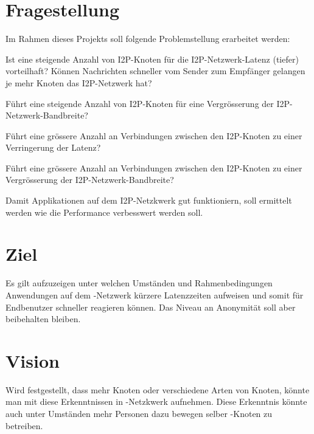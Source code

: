 \section{Fragestellung}

Im Rahmen dieses Projekts soll folgende Problemstellung erarbeitet werden:

\begin{hyp} \label{hyp:first}
    Ist eine steigende Anzahl von I2P-Knoten für die I2P-Netzwerk-Latenz (tiefer) vorteilhaft?
    Können Nachrichten schneller vom Sender zum Empfänger gelangen je mehr Knoten das I2P-Netzwerk hat?
\end{hyp}

\begin{hyp} \label{hyp:second}
    Führt eine steigende Anzahl von I2P-Knoten für eine Vergrösserung der I2P-Netzwerk-Bandbreite?
\end{hyp}

\begin{hyp} \label{hyp:third}
    Führt eine grössere Anzahl an Verbindungen zwischen den I2P-Knoten zu einer Verringerung der Latenz?
\end{hyp}

\begin{hyp} \label{hyp:fourth}
    Führt eine grössere Anzahl an Verbindungen zwischen den I2P-Knoten zu einer Vergrösserung der I2P-Netzwerk-Bandbreite?
\end{hyp}

Damit Applikationen auf dem I2P-Netzkwerk gut funktioniern, soll ermittelt werden wie die Performance
verbesswert werden soll.

\section{Ziel}

Es gilt aufzuzeigen unter welchen Umständen und Rahmenbedingungen Anwendungen auf dem -Netzwerk kürzere Latenzzeiten aufweisen
und somit für Endbenutzer schneller reagieren können. Das Niveau an Anonymität soll aber beibehalten bleiben.


\section{Vision}

Wird festgestellt, dass mehr Knoten oder verschiedene Arten von Knoten, könnte man mit diese Erkenntnissen in -Netzkwerk aufnehmen.
Diese Erkenntnis könnte auch unter Umständen mehr Personen dazu bewegen selber -Knoten zu betreiben.

